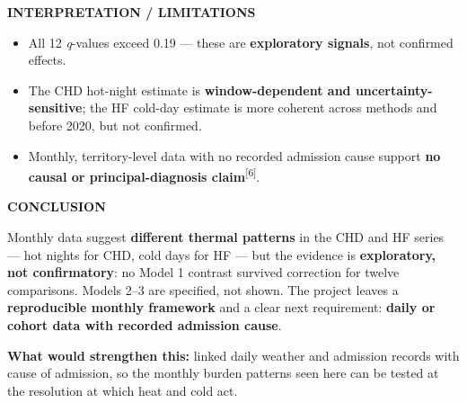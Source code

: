 \documentclass[12pt]{article}
\newcommand{\sechead}[1]{%
  {\color{Navy}\bfseries\fontsize{34}{40}\selectfont #1\par}%
  \vspace{1.4mm}{\color{Teal}\rule{\linewidth}{2.6pt}\par}\vspace{7mm}}
\newcommand{\body}{\fontsize{26}{33}\selectfont}
\newcommand{\notetext}[1]{{\color{Slate}\fontsize{18.5}{24}\selectfont #1\par}}
\begin{document}
\noindent\begin{minipage}[t]{0.485\linewidth}
\sechead{INTERPRETATION / LIMITATIONS}
\body
\begin{itemize}
  \item All 12 \textit{q}-values exceed 0.19 --- these are \textbf{exploratory
        signals}, not confirmed effects.
  \item The CHD hot-night estimate is \textbf{window-dependent and
        uncertainty-sensitive}; the HF cold-day estimate is more coherent
        across methods and before 2020, but not confirmed.
  \item Monthly, territory-level data with no recorded admission cause support
        \textbf{no causal or principal-diagnosis claim}\textsuperscript{[6]}.
\end{itemize}
\end{minipage}\hfill\begin{minipage}[t]{0.485\linewidth}
\sechead{CONCLUSION}
\begin{takeawaybox}
\fontsize{27}{34.5}\selectfont
Monthly data suggest \textbf{different thermal patterns} in the CHD and HF
series --- hot nights for CHD, cold days for HF --- but the evidence is
\textbf{exploratory, not confirmatory}: no Model 1 contrast survived
correction for twelve comparisons. Models 2--3 are specified, not shown.
The project leaves a \textbf{reproducible monthly framework} and a clear
next requirement: \textbf{daily or cohort data with recorded admission
cause}.\par
\end{takeawaybox}

\vspace{3mm}
\notetext{\textbf{What would strengthen this:} linked daily weather and
admission records with cause of admission, so the monthly burden patterns seen
here can be tested at the resolution at which heat and cold act.}
\end{minipage}%
\par
\vspace{2mm}
\end{document}
